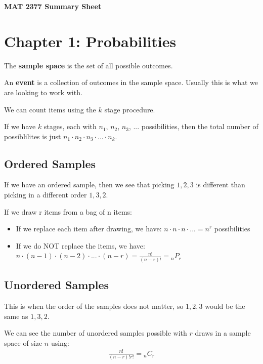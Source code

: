 \documentclass[12pt,letterpaper]{article} \usepackage{amsmath} \usepackage{graphicx} \usepackage[margin=1in]{geometry} \usepackage{longtable}  \usepackage{amssymb}
\begin{document}
	
	\begin{center}
		\Large\textbf{MAT 2377 Summary Sheet} \\
		\vspace{0.5em}
	\end{center}
	
	\section{Chapter 1: Probabilities}
	The \textbf{sample space} is the set of all possible outcomes. 
	
	An \textbf{event} is a collection of outcomes in the sample space. Usually this is what we are looking to work with. 
	
	We can count items using the $k$ stage procedure. 
	
	If we have $k$ stages, each with $n_1$, $n_2$, $n_3$, ... possibilities, then the total number of possiblilites is just $n_1\cdot n_2\cdot n_3\cdot ...\cdot n_k$.
	
	\subsection{Ordered Samples}
	If we have an ordered sample, then we see that picking $1, 2, 3$ is different than picking in a different order $1, 3, 2$.
	
	If we draw r items from a bag of n items:
	\begin{itemize}[]
		\item If we replace each item after drawing, we have: $n\cdot n\cdot n\cdot ... = n^r$ possibilities
		\item If we do NOT replace the items, we have: $n\cdot (n-1)\cdot (n-2)\cdot ...\cdot (n-r) = \frac{n!}{(n-r)!}= {}_nP_r$
	\end{itemize}
	
	\subsection{Unordered Samples}
	This is when the order of the samples does not matter, so $1,2,3$ would be the same as $1,3,2$. 
	
	We can see the number of unordered samples possible with $r$ draws in a sample space of size $n$ using:
	\begin{align*}
		\frac{n!}{(n-r)!r!} = {}_nC_r
	\end{align*}
\end{document}
